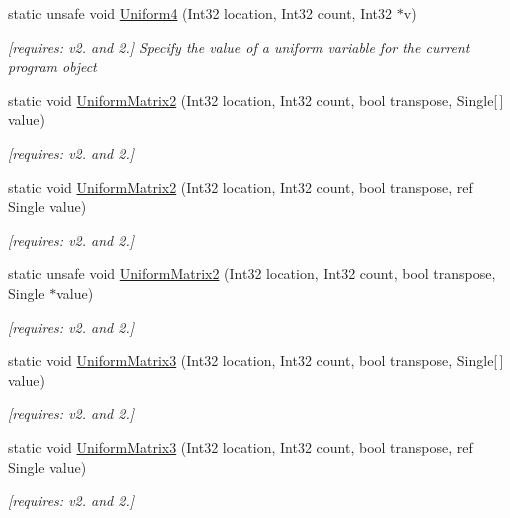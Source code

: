 \begin{DoxyCompactItemize}
static unsafe void \hyperlink{class_open_t_k_1_1_graphics_1_1_e_s20_1_1_g_l_a2facd7934a91bce3aa46f5be401b7f31}{Uniform4} (Int32 location, Int32 count, Int32 $\ast$v)
\begin{DoxyCompactList}\small\item\em \mbox{[}requires\-: v2. and 2.\mbox{]} Specify the value of a uniform variable for the current program object \end{DoxyCompactList}\item 
static void \hyperlink{class_open_t_k_1_1_graphics_1_1_e_s20_1_1_g_l_a1619ea6cd486ff641496aa27f0e15465}{Uniform\-Matrix2} (Int32 location, Int32 count, bool transpose, Single\mbox{[}$\,$\mbox{]} value)
\begin{DoxyCompactList}\small\item\em \mbox{[}requires\-: v2. and 2.\mbox{]}\end{DoxyCompactList}\item 
static void \hyperlink{class_open_t_k_1_1_graphics_1_1_e_s20_1_1_g_l_ad9cf869a3d8ba8eed7bc89970bc88fba}{Uniform\-Matrix2} (Int32 location, Int32 count, bool transpose, ref Single value)
\begin{DoxyCompactList}\small\item\em \mbox{[}requires\-: v2. and 2.\mbox{]}\end{DoxyCompactList}\item 
static unsafe void \hyperlink{class_open_t_k_1_1_graphics_1_1_e_s20_1_1_g_l_a485805ff4c2b0bae46e642ae435a86fa}{Uniform\-Matrix2} (Int32 location, Int32 count, bool transpose, Single $\ast$value)
\begin{DoxyCompactList}\small\item\em \mbox{[}requires\-: v2. and 2.\mbox{]}\end{DoxyCompactList}\item 
static void \hyperlink{class_open_t_k_1_1_graphics_1_1_e_s20_1_1_g_l_a1d04778a18140c04d980cb3c55a4c9cc}{Uniform\-Matrix3} (Int32 location, Int32 count, bool transpose, Single\mbox{[}$\,$\mbox{]} value)
\begin{DoxyCompactList}\small\item\em \mbox{[}requires\-: v2. and 2.\mbox{]}\end{DoxyCompactList}\item 
static void \hyperlink{class_open_t_k_1_1_graphics_1_1_e_s20_1_1_g_l_a04ad801c01b926fa5c9c223833c5ee57}{Uniform\-Matrix3} (Int32 location, Int32 count, bool transpose, ref Single value)
\begin{DoxyCompactList}\small\item\em \mbox{[}requires\-: v2. and 2.\mbox{]}\end{DoxyCompactList}\item 

\end{DoxyCompactItemize}
